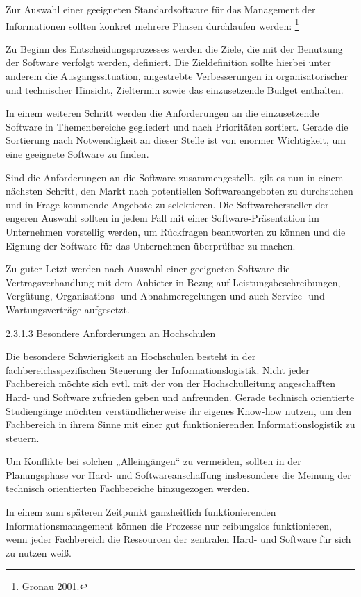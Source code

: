 \documentclass{article}
\begin{document}
\bigskip

Zur Auswahl einer geeigneten Standardsoftware für das Management der Informationen sollten konkret mehrere Phasen
durchlaufen werden: \footnote{Gronau 2001.}


\bigskip

Zu Beginn des Entscheidungsprozesses werden die Ziele, die mit der Benutzung der Software verfolgt werden, definiert.
Die Zieldefinition sollte hierbei unter anderem die Ausgangssituation, angestrebte Verbesserungen in organisatorischer
und technischer Hinsicht, Zieltermin sowie das einzusetzende Budget enthalten. 


\bigskip

In einem weiteren Schritt werden die Anforderungen an die einzusetzende Software in Themenbereiche gegliedert und nach
Prioritäten sortiert. Gerade die Sortierung nach Notwendigkeit an dieser Stelle ist von enormer Wichtigkeit, um eine
geeignete Software zu finden.


\bigskip

Sind die Anforderungen an die Software zusammengestellt, gilt es nun in einem nächsten Schritt, den Markt nach
potentiellen Softwareangeboten zu durchsuchen und in Frage kommende Angebote zu selektieren. Die Softwarehersteller der
engeren Auswahl sollten in jedem Fall mit einer Software-Präsentation im Unternehmen vorstellig werden, um Rückfragen
beantworten zu können und die Eignung der Software für das Unternehmen überprüfbar zu machen.


\bigskip

Zu guter Letzt werden nach Auswahl einer geeigneten Software die Vertragsverhandlung mit dem Anbieter in Bezug auf
Leistungsbeschreibungen, Vergütung, Organisations- und Abnahmeregelungen und auch Service- und Wartungsverträge
aufgesetzt. 


\bigskip

2.3.1.3 Besondere Anforderungen an Hochschulen


\bigskip

Die besondere Schwierigkeit an Hochschulen besteht in der fachbereichsspezifischen Steuerung der Informationslogistik.
Nicht jeder Fachbereich möchte sich evtl. mit der von der Hochschulleitung angeschafften Hard- und Software zufrieden
geben und anfreunden. Gerade technisch orientierte Studiengänge möchten verständlicherweise ihr eigenes Know-how
nutzen, um den Fachbereich in ihrem Sinne mit einer gut funktionierenden Informationslogistik zu steuern. 


\bigskip

Um Konflikte bei solchen „Alleingängen“ zu vermeiden, sollten in der Planungsphase vor Hard- und Softwareanschaffung
insbesondere die Meinung der technisch orientierten Fachbereiche hinzugezogen werden. 


\bigskip

In einem zum späteren Zeitpunkt ganzheitlich funktionierenden Informationsmanagement können die Prozesse nur reibungslos
funktionieren, wenn jeder Fachbereich die Ressourcen der zentralen Hard- und Software für sich zu nutzen weiß. 


\bigskip


\bigskip


\bigskip
\end{document}
